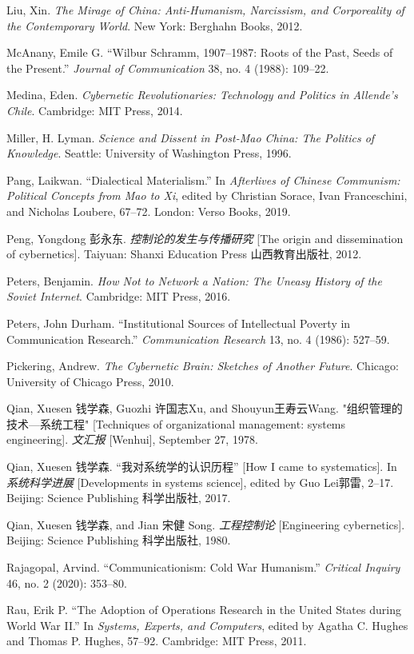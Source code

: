 \documentclass{tufte-handout}
\begin{document}
\begin{hangparas}{.25in}{1}
\begin{CJK*}{UTF8}{gbsn}
Liu, Xin. \emph{The Mirage of China: Anti-Humanism, Narcissism, and
Corporeality of the Contemporary World}. New York: Berghahn Books, 2012.

McAnany, Emile G. ``Wilbur Schramm, 1907--1987: Roots of the Past, Seeds
of the Present.'' \emph{Journal of Communication} 38, no. 4 (1988):
109--22.

Medina, Eden. \emph{Cybernetic Revolutionaries: Technology and Politics
in Allende's Chile}. Cambridge: MIT Press, 2014.

Miller, H. Lyman. \emph{Science and Dissent in Post-Mao China: The
Politics of Knowledge}. Seattle: University of Washington Press, 1996.

Pang, Laikwan. ``Dialectical Materialism.'' In \emph{Afterlives of
Chinese Communism: Political Concepts from Mao to Xi}, edited by
Christian Sorace, Ivan Franceschini, and Nicholas Loubere, 67--72.
London: Verso Books, 2019.

Peng, Yongdong 彭永东. \emph{控制论的发生与传播研究} {[}The origin and
dissemination of cybernetics{]}. Taiyuan: Shanxi Education Press
山西教育出版社, 2012.

Peters, Benjamin. \emph{How Not to Network a Nation: The Uneasy History
of the Soviet Internet}. Cambridge: MIT Press, 2016.

Peters, John Durham. ``Institutional Sources of Intellectual Poverty in
Communication Research.'' \emph{Communication Research} 13, no. 4
(1986): 527--59.

Pickering, Andrew. \emph{The Cybernetic Brain: Sketches of Another
Future}. Chicago: University of Chicago Press, 2010.

Qian, Xuesen 钱学森, Guozhi 许国志Xu, and Shouyun王寿云Wang.
"组织管理的技术---系统工程" {[}Techniques of organizational management:
systems engineering{]}. \emph{文汇报} {[}Wenhui{]}, September 27, 1978.

Qian, Xuesen 钱学森. ``我对系统学的认识历程'' {[}How I came to
systematics{]}. In \emph{系统科学进展} {[}Developments in systems
science{]}, edited by Guo Lei郭雷, 2--17. Beijing: Science Publishing
科学出版社, 2017.

Qian, Xuesen 钱学森, and Jian 宋健 Song. \emph{工程控制论}
{[}Engineering cybernetics{]}. Beijing: Science Publishing 科学出版社,
1980.

Rajagopal, Arvind. ``Communicationism: Cold War Humanism.''
\emph{Critical Inquiry} 46, no. 2 (2020): 353--80.

Rau, Erik P. ``The Adoption of Operations Research in the United States
during World War II.'' In \emph{Systems, Experts, and Computers}, edited
by Agatha C. Hughes and Thomas P. Hughes, 57--92. Cambridge: MIT Press,
2011.


\end{CJK*}
\end{hangparas}
\end{document}
